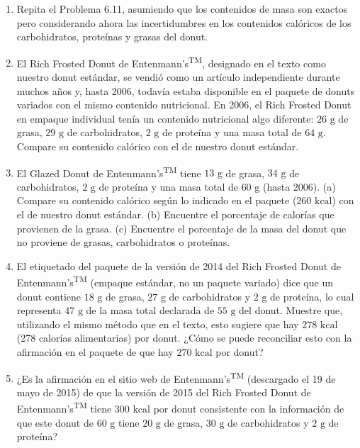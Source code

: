 \documentclass[12pt]{book}
\begin{document}
\begin{enumerate}
\item[6.12] Repita el Problema 6.11, asumiendo que los contenidos de masa son exactos pero considerando ahora las incertidumbres en los contenidos calóricos de los carbohidratos, proteínas y grasas del donut.

\item[6.13] El Rich Frosted Donut de Entenmann's\textsuperscript{TM}, designado en el texto como nuestro donut estándar, se vendió como un artículo independiente durante muchos años y, hasta 2006, todavía estaba disponible en el paquete de donuts variados con el mismo contenido nutricional. En 2006, el Rich Frosted Donut en empaque individual tenía un contenido nutricional algo diferente: $26\text{ g}$ de grasa, $29\text{ g}$ de carbohidratos, $2\text{ g}$ de proteína y una masa total de $64\text{ g}$. Compare su contenido calórico con el de nuestro donut estándar.

\item[6.14] El Glazed Donut de Entenmann's\textsuperscript{TM} tiene $13\text{ g}$ de grasa, $34\text{ g}$ de carbohidratos, $2\text{ g}$ de proteína y una masa total de $60\text{ g}$ (hasta 2006). (a) Compare su contenido calórico según lo indicado en el paquete ($260\text{ kcal}$) con el de nuestro donut estándar. (b) Encuentre el porcentaje de calorías que provienen de la grasa. (c) Encuentre el porcentaje de la masa del donut que no proviene de grasas, carbohidratos o proteínas.

\item[6.15] El etiquetado del paquete de la versión de 2014 del Rich Frosted Donut de Entenmann's\textsuperscript{TM} (empaque estándar, no un paquete variado) dice que un donut contiene $18\text{ g}$ de grasa, $27\text{ g}$ de carbohidratos y $2\text{ g}$ de proteína, lo cual representa $47\text{ g}$ de la masa total declarada de $55\text{ g}$ del donut. Muestre que, utilizando el mismo método que en el texto, esto sugiere que hay $278\text{ kcal}$ (278 calorías alimentarias) por donut. ¿Cómo se puede reconciliar esto con la afirmación en el paquete de que hay $270\text{ kcal}$ por donut?

\item[6.16] ¿Es la afirmación en el sitio web de Entenmann's\textsuperscript{TM} (descargado el 19 de mayo de 2015) de que la versión de 2015 del Rich Frosted Donut de Entenmann's\textsuperscript{TM} tiene $300\text{ kcal}$ por donut consistente con la información de que este donut de $60\text{ g}$ tiene $20\text{ g}$ de grasa, $30\text{ g}$ de carbohidratos y $2\text{ g}$ de proteína?


\end{enumerate}
\end{document}
